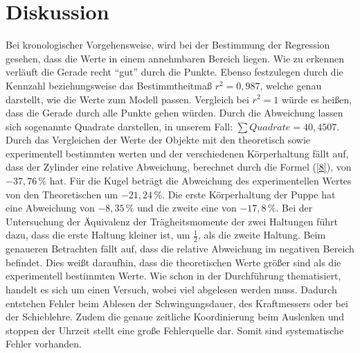 \section{Diskussion}

\begin{flushleft}
    Bei kronologischer Vorgehensweise, wird bei der Bestimmung der Regression gesehen, dass die Werte in einem annehmbaren Bereich liegen.
    Wie zu erkennen verläuft die Gerade recht \enquote{gut} durch die Punkte. 
    Ebenso festzulegen durch die Kennzahl beziehungsweise das Bestimmtheitmaß $ r^2 = 0,987 $, welche genau darstellt, wie die Werte zum Modell passen. 
    Vergleich bei $ r^2 = 1 $ würde es heißen, dass die Gerade durch alle Punkte gehen würden. Durch die Abweichung lassen sich sogenannte Quadrate darstellen, in unserem Fall: $ \sum \limits Quadrate = 40,4507 $.
    Durch das Vergleichen der Werte der Objekte mit den theoretisch sowie experimentell bestimmten werten und der verschiedenen Körperhaltung fällt auf, dass der Zylinder eine relative Abweichung, berechnet durch die Formel (\ref{8}), von $ -37,76 \, \% $ hat. 
    Für die Kugel beträgt die Abweichung des experimentellen Wertes von den Theoretischen um $ -21,24 \, \% $. 
    Die erste Körperhaltung der Puppe hat eine Abweichung von $ -8,35 \, \% $ und die zweite eine von $ -17,8 \,\% $. 
    Bei der Untersuchung der Äquivalenz der Trägheitsmomente der zwei Haltungen führt dazu, dass die erste Haltung kleiner ist, um $ \frac{1}{2} $, als die zweite Haltung. 
    Beim genaueren Betrachten fällt auf, dass die relative Abweichung im negativen Bereich befindet. 
    Dies weißt daraufhin, dass die theoretischen Werte größer sind als die experimentell bestimmten Werte. 
    Wie schon in der Durchführung thematisiert, handelt es sich um einen Versuch, wobei viel abgelesen werden muss. 
    Dadurch entstehen Fehler beim Ablesen der Schwingungsdauer, des Kraftmessers oder bei der Schieblehre.
    Zudem die genaue zeitliche Koordinierung beim Auslenken und stoppen der Uhrzeit stellt eine große Fehlerquelle dar. 
    Somit sind systematische Fehler vorhanden.
\end{flushleft}